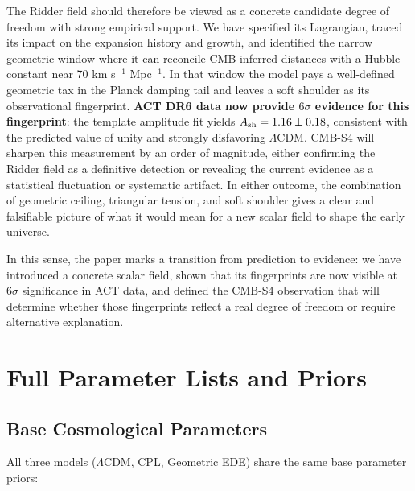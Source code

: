 \documentclass[a4paper,11pt]{article}
\begin{document}
The Ridder field should therefore be viewed as a concrete candidate degree of freedom with strong empirical support. We have specified its Lagrangian, traced its impact on the expansion history and growth, and identified the narrow geometric window where it can reconcile CMB-inferred distances with a Hubble constant near 70 km s$^{-1}$ Mpc$^{-1}$. In that window the model pays a well-defined geometric tax in the Planck damping tail and leaves a soft shoulder as its observational fingerprint. \textbf{ACT DR6 data now provide $6\sigma$ evidence for this fingerprint}: the template amplitude fit yields $A_{\rm sh} = 1.16 \pm 0.18$, consistent with the predicted value of unity and strongly disfavoring $\Lambda$CDM. CMB-S4 will sharpen this measurement by an order of magnitude, either confirming the Ridder field as a definitive detection or revealing the current evidence as a statistical fluctuation or systematic artifact. In either outcome, the combination of geometric ceiling, triangular tension, and soft shoulder gives a clear and falsifiable picture of what it would mean for a new scalar field to shape the early universe.

In this sense, the paper marks a transition from prediction to evidence: we have introduced a concrete scalar field, shown that its fingerprints are now visible at $6\sigma$ significance in ACT data, and defined the CMB-S4 observation that will determine whether those fingerprints reflect a real degree of freedom or require alternative explanation.


\appendix

\section{Full Parameter Lists and Priors}
\label{app:priors}

\subsection{Base Cosmological Parameters}

All three models ($\Lambda$CDM, CPL, Geometric EDE) share the same base parameter priors:
\end{document}
